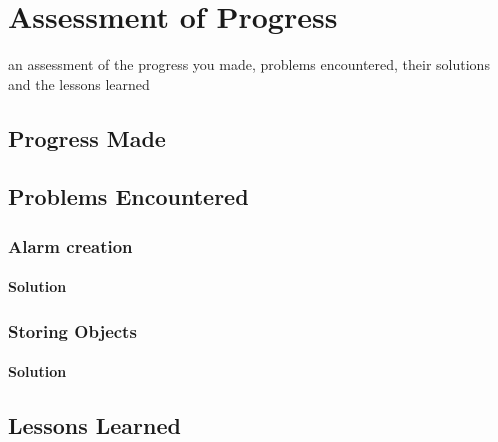 \section{Assessment of Progress}\label{assessment-of-progress}

an assessment of the progress you made, problems encountered, their
solutions and the lessons learned

\subsection{Progress Made}\label{progress-made}

\subsection{Problems Encountered}\label{problems-encountered}

\subsubsection{Alarm creation}\label{alarm-creation}

\paragraph{Solution}\label{solution}

\subsubsection{Storing Objects}\label{storing-objects}

\paragraph{Solution}\label{solution-1}

\subsection{Lessons Learned}\label{lessons-learned}
